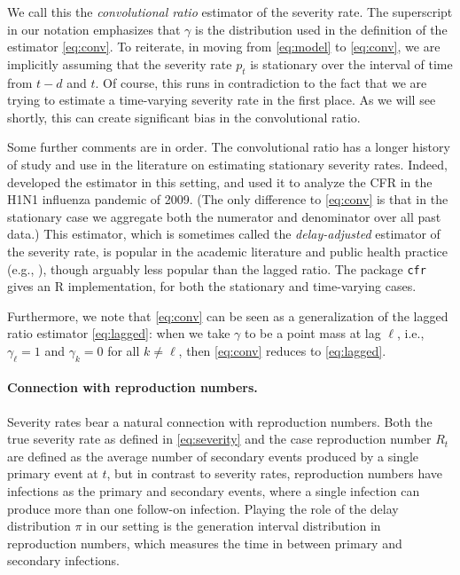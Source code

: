 \documentclass{article}
\renewcommand{\hat}{\widehat} %
\begin{document}
We call this the \emph{convolutional ratio} estimator of the severity rate. The superscript in our notation \smash{$\hat{p}_t^\gamma$} emphasizes that
$\gamma$ is the distribution used in the definition of the estimator
\eqref{eq:conv}. To reiterate, in moving from \eqref{eq:model} to
\eqref{eq:conv}, we are implicitly assuming that the severity rate $p_t$ is
stationary over the interval of time from $t-d$ and $t$. Of course, this runs in
contradiction to the fact that we are trying to estimate a time-varying severity
rate in the first place. As we will see shortly, this can create significant
bias in the convolutional ratio.  

Some further comments are in order. The convolutional ratio has a longer history
of study and use in the literature on estimating stationary severity
rates. Indeed, \citet{nishiura} developed the estimator in this setting,  
and used it to analyze the CFR in the H1N1 influenza pandemic of 2009. (The only 
difference to \eqref{eq:conv} is that in the stationary case we aggregate both
the numerator and denominator over all past data.) This estimator, which is
sometimes called the \emph{delay-adjusted} estimator of the severity rate, is
popular in the academic literature and public health practice (e.g., 
\citealp{nishiuraEx1, nishiuraEx2, Russell2020, Unnikrishnan2021}), though   
arguably less popular than the lagged ratio. The package \texttt{cfr}
\citep{cfr_package} gives an R implementation, for both the stationary and
time-varying cases.  

Furthermore, we note that \eqref{eq:conv} can be seen as a generalization of the  
lagged ratio estimator \eqref{eq:lagged}: when we take $\gamma$ to be a point
mass at lag $\ell$, i.e., $\gamma_\ell = 1$ and $\gamma_k = 0$ for all $k \not=
\ell$, then \eqref{eq:conv} reduces to \eqref{eq:lagged}.   

\paragraph{Connection with reproduction numbers.} 

Severity rates bear a natural connection with reproduction numbers. Both the
true severity rate as defined in \eqref{eq:severity} and the case reproduction
number $R_t$ are defined as the average number of secondary events produced by a
single primary event at $t$, but in contrast to severity rates, reproduction
numbers have infections as the primary and secondary events, where a single
infection can produce more than one follow-on infection. Playing the role of the
delay distribution $\pi$ in our setting is the generation interval distribution
in reproduction numbers, which measures the time in between primary and
secondary infections.  
\end{document}
